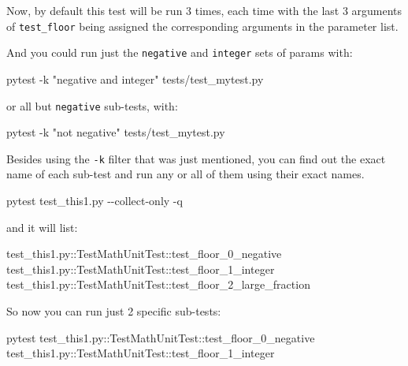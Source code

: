 \documentclass[
]{report}
\newenvironment{Shaded}{\begin{snugshade}}{\end{snugshade}}
\newcommand{\AttributeTok}[1]{\textcolor[rgb]{0.40,0.45,0.13}{#1}}
\newcommand{\ExtensionTok}[1]{\textcolor[rgb]{0.00,0.23,0.31}{#1}}
\newcommand{\NormalTok}[1]{\textcolor[rgb]{0.00,0.23,0.31}{#1}}
\newcommand{\StringTok}[1]{\textcolor[rgb]{0.13,0.47,0.30}{#1}}
\begin{document}
Now, by default this test will be run 3 times, each time with the last 3
arguments of \texttt{test\_floor} being assigned the corresponding
arguments in the parameter list.

And you could run just the \texttt{negative} and \texttt{integer} sets
of params with:

\begin{Shaded}
\begin{Highlighting}[]
\ExtensionTok{pytest} \AttributeTok{{-}k} \StringTok{"negative and integer"}\NormalTok{ tests/test\_mytest.py}
\end{Highlighting}
\end{Shaded}

or all but \texttt{negative} sub-tests, with:

\begin{Shaded}
\begin{Highlighting}[]
\ExtensionTok{pytest} \AttributeTok{{-}k} \StringTok{"not negative"}\NormalTok{ tests/test\_mytest.py}
\end{Highlighting}
\end{Shaded}

Besides using the \texttt{-k} filter that was just mentioned, you can
find out the exact name of each sub-test and run any or all of them
using their exact names.

\begin{Shaded}
\begin{Highlighting}[]
\ExtensionTok{pytest}\NormalTok{ test\_this1.py }\AttributeTok{{-}{-}collect{-}only} \AttributeTok{{-}q}
\end{Highlighting}
\end{Shaded}

and it will list:

\begin{Shaded}
\begin{Highlighting}[]
\ExtensionTok{test\_this1.py::TestMathUnitTest::test\_floor\_0\_negative}
\ExtensionTok{test\_this1.py::TestMathUnitTest::test\_floor\_1\_integer}
\ExtensionTok{test\_this1.py::TestMathUnitTest::test\_floor\_2\_large\_fraction}
\end{Highlighting}
\end{Shaded}

So now you can run just 2 specific sub-tests:

\begin{Shaded}
\begin{Highlighting}[]
\ExtensionTok{pytest}\NormalTok{ test\_this1.py::TestMathUnitTest::test\_floor\_0\_negative  test\_this1.py::TestMathUnitTest::test\_floor\_1\_integer}
\end{Highlighting}
\end{Shaded}
\end{document}
